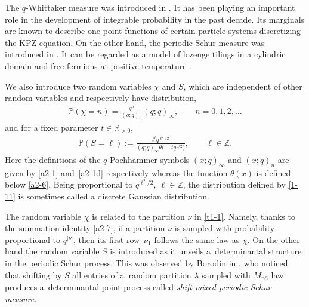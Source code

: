 \documentclass[11pt]{article}
\numberwithin{equation}{section}
\numberwithin{equation}{section}
\def\i{\infty}
\def\P{\mathbb{P}}
\begin{document}
 The $q$-Whittaker measure was introduced in \cite{BorodinCorwin2014Mac}. It has been playing an important role in the development of integrable probability in the past decade. Its marginals are known to describe one point functions of certain particle systems discretizing the KPZ equation. On the other hand, the periodic Schur measure was introduced in \cite{Borodin2007PeriodicSchur}. It can be regarded as a model of lozenge tilings in a cylindric domain and free fermions at positive temperature \cite{BeteaBouttier2019PeriodicSchur}.

 We also introduce two random variables $\chi$ and $S$, which are independent of other random variables and respectively have distribution,
 \begin{align}
\label{t11-3}
\P(\chi=n)=\frac{q^n}{(q;q)_n}(q;q)_{\i},
\qquad
n=0,1,2,\dots
\end{align}
and for a fixed parameter $t \in \mathbb{R}_{>0}$,
 \begin{align}
 \label{1-11}
 \P(S=\ell):=\frac{t^{\ell} q^{\ell^2/2}}{(q;q)_\i
 \theta \bigl(-tq^{1/2}\bigr)},
 \qquad
\ell \in \mathbb{Z}.
\end{align}
Here the definitions of the $q$-Pochhammer symbols
$(x;q)_\i$ and $(x;q)_n$ are given by \eqref{a2-1} and~\eqref{a2-1d} respectively whereas the function $\theta(x)$ is defined below \eqref{a2-6}. Being proportional to $q^{\ell^2/2},~\ell\in\mathbb{Z}$, the distribution defined by \eqref{1-11} is sometimes called a discrete Gaussian distribution.

The random variable $\chi$ is related to the partition $\nu$ in \eqref{t1-1}.
Namely, thanks to the summation identity \eqref{a2-7}, if a partition $\nu$ is sampled with probability proportional to $q^{|\nu|}$, then its first row~$\nu_1$ follows the same law as $\chi$. On the other hand the random variable $S$ is introduced as it unveils a~determinantal structure in the periodic Schur process. This was observed by Borodin in \cite{Borodin2007PeriodicSchur}, who noticed that shifting by $S$ all entries of a~random partition $\lambda$ sampled with $M_{\mathrm{pS}}$ law produces a~determinantal point process called \emph{shift-mixed periodic Schur measure}.
\end{document}
